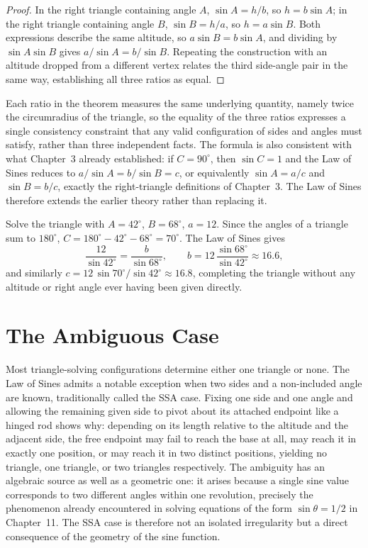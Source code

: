 \begin{proof}
In the right triangle containing angle $A$, $\sin A = h/b$, so $h =
b\sin A$; in the right triangle containing angle $B$, $\sin B = h/a$, so
$h = a\sin B$. Both expressions describe the same altitude, so $a\sin B =
b\sin A$, and dividing by $\sin A \sin B$ gives $a/\sin A = b/\sin B$.
Repeating the construction with an altitude dropped from a different
vertex relates the third side-angle pair in the same way, establishing all
three ratios as equal.
\end{proof}

Each ratio in the theorem measures the same underlying quantity, namely
twice the circumradius of the triangle, so the equality of the three
ratios expresses a single consistency constraint that any valid
configuration of sides and angles must satisfy, rather than three
independent facts. The formula is also consistent with what Chapter~3
already established: if $C = 90^\circ$, then $\sin C = 1$ and the Law of
Sines reduces to $a/\sin A = b/\sin B = c$, or equivalently $\sin A = a/c$
and $\sin B = b/c$, exactly the right-triangle definitions of Chapter~3.
The Law of Sines therefore extends the earlier theory rather than
replacing it.

\begin{example}
Solve the triangle with $A = 42^\circ$, $B = 68^\circ$, $a = 12$. Since the
angles of a triangle sum to $180^\circ$, $C = 180^\circ - 42^\circ -
68^\circ = 70^\circ$. The Law of Sines gives
\[
\frac{12}{\sin42^\circ} = \frac{b}{\sin68^\circ}, \qquad
b = 12\,\frac{\sin68^\circ}{\sin42^\circ} \approx 16.6,
\]
and similarly $c = 12\,\sin70^\circ/\sin42^\circ \approx 16.8$, completing
the triangle without any altitude or right angle ever having been given
directly.
\end{example}

\section{The Ambiguous Case}

Most triangle-solving configurations determine either one triangle or
none. The Law of Sines admits a notable exception when two sides and a
non-included angle are known, traditionally called the SSA case. Fixing
one side and one angle and allowing the remaining given side to pivot
about its attached endpoint like a hinged rod shows why: depending on its
length relative to the altitude and the adjacent side, the free endpoint
may fail to reach the base at all, may reach it in exactly one position,
or may reach it in two distinct positions, yielding no triangle, one
triangle, or two triangles respectively. The ambiguity has an algebraic
source as well as a geometric one: it arises because a single sine value
corresponds to two different angles within one revolution, precisely the
phenomenon already encountered in solving equations of the form
$\sin\theta = 1/2$ in Chapter~11. The SSA case is therefore not an
isolated irregularity but a direct consequence of the geometry of the
sine function.

